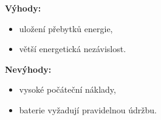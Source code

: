\begin{multicols}{2}
    \textbf{Výhody:}
    \begin{itemize}[leftmargin=*]
        \item uložení přebytků energie,
        \item větší energetická nezávislost.
    \end{itemize}
    
    \columnbreak
    
    \textbf{Nevýhody:}
    \begin{itemize}[leftmargin=*]
        \item vysoké počáteční náklady,
        \item baterie vyžadují pravidelnou údržbu.
    \end{itemize}
    
\end{multicols}